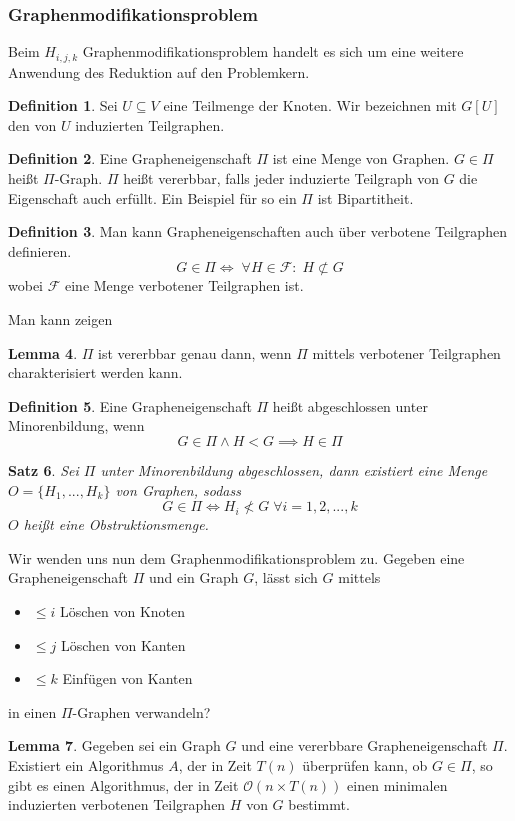 \documentclass[a4paper, 12pt]{article}
\theoremstyle{plain}
\newtheorem{theorem}{Satz}[section] %
\theoremstyle{definition}
\newtheorem{definition}[theorem]{Definition} %
\theoremstyle{lemma}
\newtheorem{lemma}[theorem]{Lemma}
\theoremstyle{remark}
\theoremstyle{corollary}
\theoremstyle{example}
\begin{document}
	\subsubsection{Graphenmodifikationsproblem}
	Beim $H_{i,j,k}$ Graphenmodifikationsproblem handelt es sich um eine weitere Anwendung des Reduktion auf den Problemkern.
	\begin{definition}
		Sei $U \subseteq V$ eine Teilmenge der Knoten. Wir bezeichnen mit $G[U]$ den von $U$ induzierten Teilgraphen.
	\end{definition}
	\begin{definition}
		Eine Grapheneigenschaft $\Pi$ ist eine Menge von Graphen. $G \in \Pi$ heißt $\Pi$-Graph. $\Pi$ heißt vererbbar, falls jeder induzierte Teilgraph von $G$ die Eigenschaft auch erfüllt. Ein Beispiel für so ein $\Pi$ ist Bipartitheit.
	\end{definition}
	\begin{definition}
		Man kann Grapheneigenschaften auch über verbotene Teilgraphen definieren. \[G \in \Pi \Leftrightarrow \; \forall H \in \mathcal{F}: \; H \not \subset G\] wobei $\mathcal{F}$ eine Menge verbotener Teilgraphen ist.
	\end{definition}
	Man kann zeigen \begin{lemma}
		$\Pi$ ist vererbbar genau dann, wenn $\Pi$ mittels verbotener Teilgraphen charakterisiert werden kann.
	\end{lemma}
	\begin{definition}
		Eine Grapheneigenschaft $\Pi$ heißt abgeschlossen unter Minorenbildung, wenn \[G\in \Pi \land H < G \implies H \in \Pi\] 
	\end{definition}
	\begin{theorem}
		Sei $\Pi$ unter Minorenbildung abgeschlossen, dann existiert eine Menge $O = \{H_1,...,H_k\}$ von Graphen, sodass \[G \in \Pi \Leftrightarrow H_i \not < G \; \forall i = 1,2,...,k\] $O$ heißt eine Obstruktionsmenge.
	\end{theorem}
	Wir wenden uns nun dem Graphenmodifikationsproblem zu. Gegeben eine Grapheneigenschaft $\Pi$ und ein Graph $G$, lässt sich $G$ mittels \begin{itemize}
		\item $\leq i$ Löschen von Knoten
		\item $\leq j$ Löschen von Kanten
		\item $\leq k$ Einfügen von Kanten
	\end{itemize}
	in einen $\Pi$-Graphen verwandeln?
	\begin{lemma}
		Gegeben sei ein Graph $G$ und eine vererbbare Grapheneigenschaft $\Pi$. Existiert ein Algorithmus $A$, der in Zeit $T(n)$ überprüfen kann, ob $G \in \Pi$, so gibt es einen Algorithmus, der in Zeit $\mathcal{O}(n \times T(n))$ einen minimalen induzierten verbotenen Teilgraphen $H$ von $G$ bestimmt.
	\end{lemma}
\end{document}
